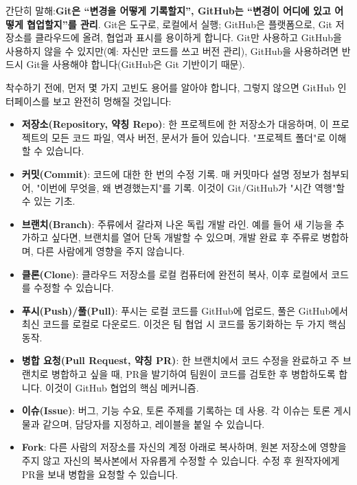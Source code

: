 간단히 말해:\textbf{Git은 “변경을 어떻게 기록할지”, GitHub는 “변경이 어디에 있고 어떻게 협업할지”를 관리}. Git은 도구로, 로컬에서 실행; GitHub은 플랫폼으로, Git 저장소를 클라우드에 올려, 협업과 표시를 용이하게 합니다. Git만 사용하고 GitHub을 사용하지 않을 수 있지만(예: 자신만 코드를 쓰고 버전 관리), GitHub을 사용하려면 반드시 Git을 사용해야 합니다(GitHub은 Git 기반이기 때문).



착수하기 전에, 먼저 몇 가지 고빈도 용어를 알아야 합니다, 그렇지 않으면 GitHub 인터페이스를 보고 완전히 멍해질 것입니다:

\begin{itemize}
  \item \textbf{저장소(Repository, 약칭 Repo)}: 한 프로젝트에 한 저장소가 대응하며, 이 프로젝트의 모든 코드 파일, 역사 버전, 문서가 들어 있습니다. "프로젝트 폴더"로 이해할 수 있습니다.
  \item \textbf{커밋(Commit)}: 코드에 대한 한 번의 수정 기록. 매 커밋마다 설명 정보가 첨부되어, "이번에 무엇을, 왜 변경했는지"를 기록. 이것이 Git/GitHub가 "시간 역행"할 수 있는 기초.
  \item \textbf{브랜치(Branch)}: 주류에서 갈라져 나온 독립 개발 라인. 예를 들어 새 기능을 추가하고 싶다면, 브랜치를 열어 단독 개발할 수 있으며, 개발 완료 후 주류로 병합하며, 다른 사람에게 영향을 주지 않습니다.
  \item \textbf{클론(Clone)}: 클라우드 저장소를 로컬 컴퓨터에 완전히 복사, 이후 로컬에서 코드를 수정할 수 있습니다.
  \item \textbf{푸시(Push)/풀(Pull)}: 푸시는 로컬 코드를 GitHub에 업로드, 풀은 GitHub에서 최신 코드를 로컬로 다운로드. 이것은 팀 협업 시 코드를 동기화하는 두 가지 핵심 동작.
  \item \textbf{병합 요청(Pull Request, 약칭 PR)}: 한 브랜치에서 코드 수정을 완료하고 주 브랜치로 병합하고 싶을 때, PR을 발기하여 팀원이 코드를 검토한 후 병합하도록 합니다. 이것이 GitHub 협업의 핵심 메커니즘.
  \item \textbf{이슈(Issue)}: 버그, 기능 수요, 토론 주제를 기록하는 데 사용. 각 이슈는 토론 게시물과 같으며, 담당자를 지정하고, 레이블을 붙일 수 있습니다.
  \item \textbf{Fork}: 다른 사람의 저장소를 자신의 계정 아래로 복사하며, 원본 저장소에 영향을 주지 않고 자신의 복사본에서 자유롭게 수정할 수 있습니다. 수정 후 원작자에게 PR을 보내 병합을 요청할 수 있습니다.
\end{itemize}

